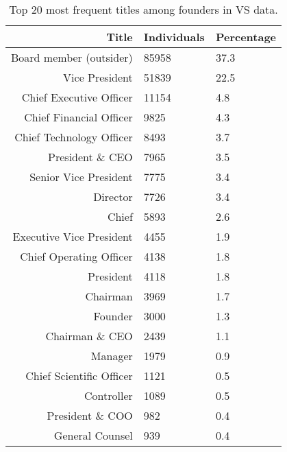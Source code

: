 \begin{table}[!htb]
\centering
\begingroup\footnotesize
\begin{tabular}{rll}
  \toprule
Title & Individuals & Percentage \\ 
  \midrule
Board member (outsider) & 85958 & 37.3 \\ 
  Vice President & 51839 & 22.5 \\ 
  Chief Executive Officer & 11154 & 4.8 \\ 
  Chief Financial Officer & 9825 & 4.3 \\ 
  Chief Technology Officer & 8493 & 3.7 \\ 
  President \& CEO & 7965 & 3.5 \\ 
  Senior Vice President & 7775 & 3.4 \\ 
  Director & 7726 & 3.4 \\ 
  Chief & 5893 & 2.6 \\ 
  Executive Vice President & 4455 & 1.9 \\ 
  Chief Operating Officer & 4138 & 1.8 \\ 
  President & 4118 & 1.8 \\ 
  Chairman & 3969 & 1.7 \\ 
  Founder & 3000 & 1.3 \\ 
  Chairman \& CEO & 2439 & 1.1 \\ 
  Manager & 1979 & 0.9 \\ 
  Chief Scientific Officer & 1121 & 0.5 \\ 
  Controller & 1089 & 0.5 \\ 
  President \& COO & 982 & 0.4 \\ 
  General Counsel & 939 & 0.4 \\ 
   \bottomrule
\end{tabular}
\endgroup
\caption{Top 20 most frequent titles among founders in VS data.} 
\label{table:VS_titlesSummaryTable}
\end{table}
